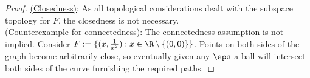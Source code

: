 \documentclass[12pt]{article}
\begin{document}
\begin{homeworkProblem}
\begin{proof}
\underline{(Closedness)}: As all topological considerations dealt with the subspace topology for $ F $, the closedness is not necessary.\\

\underline{(Counterexample for connectedness)}: The connectedness assumption is not implied. Consider $ F:=\{(x, \frac{1}{x^{2}}): x\in \R\setminus \{(0,0)\}\} $. Points on both sides of the graph become arbitrarily close, so eventually given any $ \eps $ a ball will intersect both sides of the curve furnishing the required paths.

\end{proof}

\end{homeworkProblem}
\end{document}
